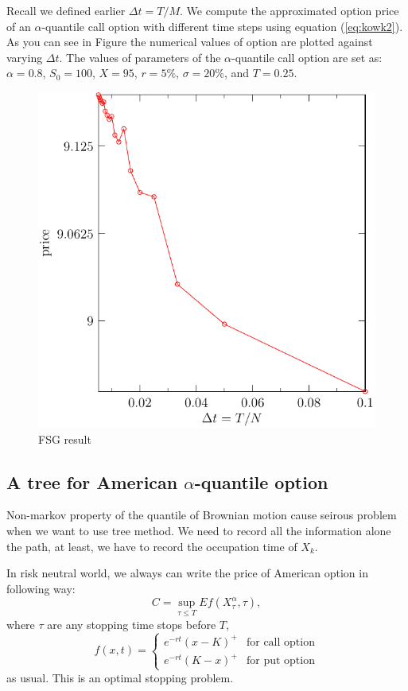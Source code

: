\documentclass[12pt,oneside,titlepage]{book}
\begin{document}
Recall we defined earlier $\Delta t = T / M$. We compute the approximated option price of an $\alpha$-quantile call option with different time steps using equation (\ref{eq:kowk2}). As you can see in Figure %
the numerical values of option are plotted against varying $\Delta t$. The values of parameters of the $\alpha$-quantile call option are set as: $ \alpha = 0.8$, $S_0 = 100$, $X = 95$, $r = 5\%$, $\sigma = 20\%$, and $T = 0.25$.
\begin{figure}[htbp]
   \centering
   \includegraphics{bfsg.pdf} %
   \caption{FSG result}
   \label{fig:2}
\end{figure}


\subsection{ A tree for American $\alpha$-quantile option}
Non-markov property of  the quantile of Brownian motion cause seirous problem 
when we want to use tree method. We need to record all the information alone the
path, at least, we have to record the occupation time of $X_k$.
 
In risk neutral world, we always can write the price of 
American option in following way:
\[
C = \sup_{\tau\leq T} Ef(X_\tau^\alpha,\tau),
\]
where $\tau$ are any stopping time stops before $T$, 
\[
f(x,t) = 
\begin{cases}
e^{-rt}(x-K)^+ & \text{for call option}\\
e^{-rt}(K-x)^+ & \text{for put option}
\end{cases}
\]
as usual.
This is an optimal stopping problem. 
\end{document}
